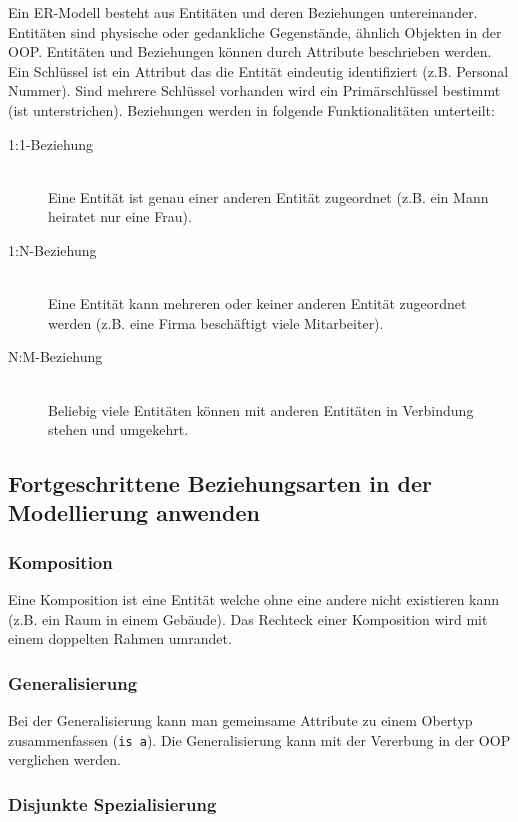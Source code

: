 Ein ER-Modell besteht aus Entitäten und deren Beziehungen untereinander. Entitäten sind physische oder gedankliche Gegenstände, ähnlich Objekten in der OOP. Entitäten und Beziehungen können durch Attribute beschrieben werden. Ein Schlüssel ist ein Attribut das die Entität eindeutig identifiziert (z.B. Personal Nummer). Sind mehrere Schlüssel vorhanden wird ein Primärschlüssel bestimmt (ist unterstrichen). Beziehungen werden in folgende Funktionalitäten unterteilt:

\begin{description}
	\item[1:1-Beziehung] \hfill \\
		  Eine Entität ist genau einer anderen Entität zugeordnet (z.B. ein Mann heiratet nur eine Frau). 
	\item[1:N-Beziehung] \hfill \\
		  Eine Entität kann mehreren oder keiner anderen Entität zugeordnet werden (z.B. eine Firma beschäftigt viele Mitarbeiter).
	\item[N:M-Beziehung] \hfill \\
		  Beliebig viele Entitäten können mit anderen Entitäten in Verbindung stehen und umgekehrt.
\end{description}

\subsection{Fortgeschrittene Beziehungsarten in der Modellierung anwenden}

\subsubsection{Komposition}

Eine Komposition ist eine Entität welche ohne eine andere nicht existieren kann (z.B. ein Raum in einem Gebäude). Das Rechteck einer Komposition wird mit einem doppelten Rahmen umrandet. 

\subsubsection{Generalisierung}

Bei der Generalisierung kann man gemeinsame Attribute zu einem Obertyp zusammenfassen (\texttt{is a}). Die Generalisierung kann mit der Vererbung in der OOP verglichen werden.

\subsubsection{Disjunkte Spezialisierung}

